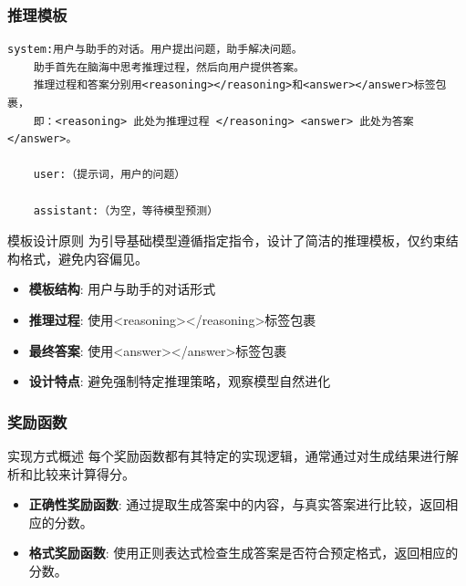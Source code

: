 \documentclass[8pt,aspectratio=169]{beamer}
\begin{document}
\begin{frame}[fragile]
    \frametitle{推理模板}
    \begin{lstlisting}[basicstyle=\small]
    system:用户与助手的对话。用户提出问题，助手解决问题。
    助手首先在脑海中思考推理过程，然后向用户提供答案。
    推理过程和答案分别用<reasoning></reasoning>和<answer></answer>标签包裹，
    即：<reasoning> 此处为推理过程 </reasoning> <answer> 此处为答案 </answer>。

    user:（提示词，用户的问题）

    assistant:（为空，等待模型预测）

    \end{lstlisting}
    
    \begin{block}{模板设计原则}
        为引导基础模型遵循指定指令，设计了简洁的推理模板，仅约束结构格式，避免内容偏见。
    \end{block}
    \begin{itemize}
        \item \textbf{模板结构}: 用户与助手的对话形式
        \item \textbf{推理过程}: 使用<reasoning></reasoning>标签包裹
        \item \textbf{最终答案}: 使用<answer></answer>标签包裹
        \item \textbf{设计特点}: 避免强制特定推理策略，观察模型自然进化
    \end{itemize}
\end{frame}

\begin{frame}
    \frametitle{奖励函数}
    \begin{block}{实现方式概述}
        每个奖励函数都有其特定的实现逻辑，通常通过对生成结果进行解析和比较来计算得分。
    \end{block}
    \begin{itemize}
        \item \textbf{正确性奖励函数}: 通过提取生成答案中的内容，与真实答案进行比较，返回相应的分数。
        \item \textbf{格式奖励函数}: 使用正则表达式检查生成答案是否符合预定格式，返回相应的分数。
    \end{itemize}
\end{frame}
\end{document}
